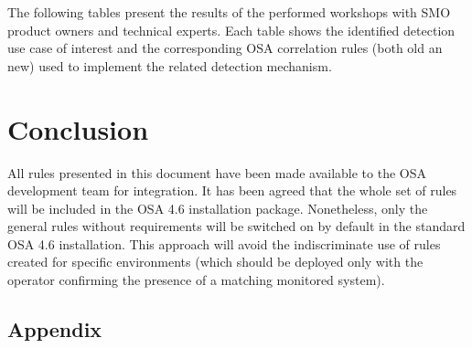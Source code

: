 \documentclass[a4paper]{report}
\begin{document}
The following tables present the results of the performed workshops with SMO product owners and technical experts. Each table shows the identified detection use case of interest and the corresponding OSA correlation rules (both old an new) used to implement the related detection mechanism.





\pagebreak

\chapter{Conclusion}

All rules presented in this document have been made available to the OSA development team for integration. It has been agreed that the whole set of rules will be included in the OSA 4.6 installation package. Nonetheless, only the general rules without requirements will be switched on by default in the standard OSA 4.6 installation. This approach will avoid the indiscriminate use of rules created for specific environments (which should be deployed only with the operator confirming the presence of a matching monitored system).

\begin{appendices}
\chapter*{Appendix}
\label{appendix}







\end{appendices}

%
%
\end{document}
